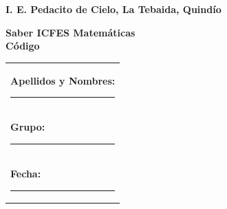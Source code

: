 \documentclass[10pt,a4paper]{article}
\makeatletter
\newcommand{\myID}{\@ID}
\newcommand{\myDate}{\@Date}
\makeatother
\begin{document}

\thispagestyle{empty}
{\sf
\textbf{\large{I. E. Pedacito de Cielo, La Tebaida, Quindío}}

\textbf{\large{Saber ICFES Matemáticas \myDate \hfill \\Código \myID}}

\vspace*{2cm}

\begin{tabular}{p{14cm}}
\textbf{Apellidos y Nombres:} \hrule \\[1.5cm]
\textbf{Grupo:} \hrule \\[1.5cm]
\textbf{Fecha:} \hrule  \\[1.5cm]
\end{tabular}

\vspace*{1cm}

}
\newpage

\begin{enumerate}


\end{enumerate}
\end{document}
